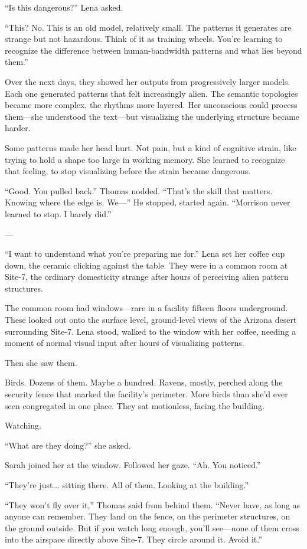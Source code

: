 ``Is this dangerous?'' Lena asked.

``This? No. This is an old model, relatively small. The patterns it generates are strange but not hazardous. Think of it as training wheels. You're learning to recognize the difference between human-bandwidth patterns and what lies beyond them.''

Over the next days, they showed her outputs from progressively larger models. Each one generated patterns that felt increasingly alien. The semantic topologies became more complex, the rhythms more layered. Her unconscious could process them—she understood the text—but visualizing the underlying structure became harder.

Some patterns made her head hurt. Not pain, but a kind of cognitive strain, like trying to hold a shape too large in working memory. She learned to recognize that feeling, to stop visualizing before the strain became dangerous.

``Good. You pulled back.'' Thomas nodded. ``That's the skill that matters. Knowing where the edge is. We—'' He stopped, started again. ``Morrison never learned to stop. I barely did.''

---

``I want to understand what you're preparing me for.'' Lena set her coffee cup down, the ceramic clicking against the table. They were in a common room at Site-7, the ordinary domesticity strange after hours of perceiving alien pattern structures.

The common room had windows—rare in a facility fifteen floors underground. These looked out onto the surface level, ground-level views of the Arizona desert surrounding Site-7. Lena stood, walked to the window with her coffee, needing a moment of normal visual input after hours of visualizing patterns.

Then she saw them.

Birds. Dozens of them. Maybe a hundred. Ravens, mostly, perched along the security fence that marked the facility's perimeter. More birds than she'd ever seen congregated in one place. They sat motionless, facing the building.

Watching.

``What are they doing?'' she asked.

Sarah joined her at the window. Followed her gaze. ``Ah. You noticed.''

``They're just... sitting there. All of them. Looking at the building.''

``They won't fly over it,'' Thomas said from behind them. ``Never have, as long as anyone can remember. They land on the fence, on the perimeter structures, on the ground outside. But if you watch long enough, you'll see—none of them cross into the airspace directly above Site-7. They circle around it. Avoid it.''

